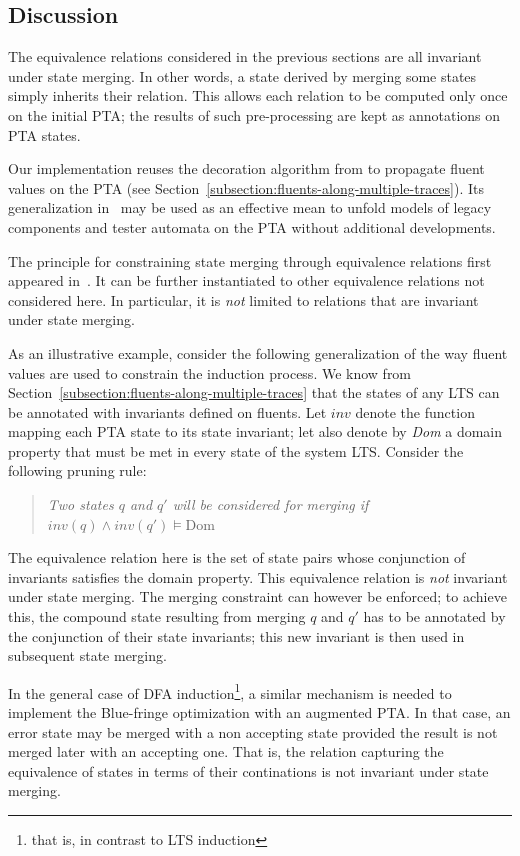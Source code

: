\subsection{Discussion\label{subsection:qsm-constraints-implementation-notes}}

The equivalence relations considered in the previous sections are all invariant under state merging. In other words, a state derived by merging some states simply inherits their relation. This allows each relation to be computed only once on the initial PTA; the results of such pre-processing are kept as annotations on PTA states. 

Our implementation reuses the decoration algorithm from \cite{Damas:2006} to propagate fluent values on the PTA (see Section~\ref{subsection:fluents-along-multiple-traces}). Its generalization in~\cite{Damas:2011} may be used as an effective mean to unfold models of legacy components and tester automata on the PTA without additional developments.

The principle for constraining state merging through equivalence relations first appeared in~\cite{Coste:1998, Coste:2004}. It can be further instantiated to other equivalence relations not considered here. In particular, it is \emph{not} limited to relations that are invariant under state merging.

As an illustrative example, consider the following generalization of the way fluent values are used to constrain the induction process. We know from Section~\ref{subsection:fluents-along-multiple-traces} that the states of any LTS can be annotated with invariants defined on fluents. Let $inv$ denote the function mapping each PTA state to its state invariant; let also denote by \emph{Dom} a domain property that must be met in every state of the system LTS. Consider the following pruning rule:
\begin{quote}
\emph{Two states $q$ and $q'$ will be considered for merging if $inv(q) \wedge inv(q') \models \mbox{Dom}$}
\end{quote}

The equivalence relation here is the set of state pairs whose conjunction of invariants satisfies the domain property. This equivalence relation is \emph{not} invariant under state merging. The merging constraint can however be enforced; to achieve this, the compound state resulting from merging $q$ and $q'$ has to be annotated by the conjunction of their state invariants; this new invariant is then used in subsequent state merging.

In the general case of DFA induction\footnote{that is, in contrast to LTS induction}, a similar mechanism is needed to implement the Blue-fringe optimization with an augmented PTA. In that case, an error state may be merged with a non accepting state provided the result is not merged later with an accepting one. That is, the relation capturing the equivalence of states in terms of their continations is not invariant under state merging.
